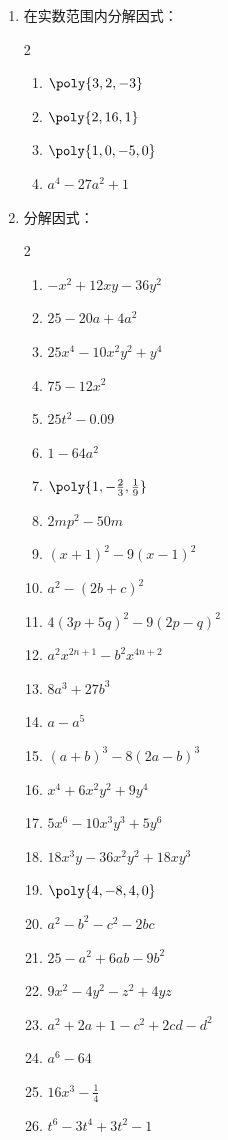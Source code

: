 \begin{enumerate}
\begin{multicols}{3}
\begin{enumerate}
\end{enumerate}
\end{multicols}
    \item 在实数范围内分解因式：
    \begin{multicols}{2}
    \begin{enumerate}
        \item $\poly{3,2,-3}$
        \item $\poly{2,16,1}$
        \item $\poly{1,0,-5,0}$
        \item $a^4-27a^2+1$
\end{enumerate}
\end{multicols}
    \item 分解因式：
    \begin{multicols}{2}
        \begin{enumerate}
        \item $-x^2+12xy-36y^2$
    \item $25-20a+4a^2$
    \item $25x^4-10x^2y^2+y^4$
    \item $75-12x^2$
    \item $25t^2-0.09$
    \item $1-64a^2$
    \item $\poly{1,-\frac{2}{3},\frac{1}{9}}$
    \item $2mp^2-50m$
    \item $(x+1)^2-9(x-1)^2$
    \item $a^2-(2b+c)^2$
    \item $4(3p+5q)^2-9(2p-q)^2$
    \item $a^2x^{2n+1}-b^2x^{4n+2}$
    \item $8a^3+27b^3$
    \item $a-a^5$
    \item $(a+b)^3-8(2a-b)^3$
    \item $x^4+6x^2y^2+9y^4$
    \item $5x^6-10x^3y^3+5y^6$
    \item $18x^3y-36x^2y^2+18xy^3$
    \item $\poly{4,-8,4,0}$
    \item $a^2-b^2-c^2-2bc$
    \item $25-a^2+6ab-9b^2$
    \item $9x^2-4y^2-z^2+4yz$
    \item $a^2+2a+1-c^2+2cd-d^2$
    \item $a^6-64$
    \item $16x^3-\frac{1}{4}$
    \item $t^6-3t^4+3t^2-1$
\end{enumerate}
    \end{multicols}
    

\end{enumerate}
